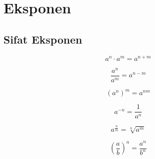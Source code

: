 \documentclass{report}
\begin{document}
\chapter{Eksponen}

\section*{Sifat Eksponen}

\begin{equation}
\label{ex_mult}
a^{n} \cdot a^{m} = a^{n+m} 
\end{equation}

\begin{equation}
\label{ex_div}
\frac{a^{n}}{a^{m}} = a^{n-m} 
\end{equation}

\begin{equation}
\label{ex_pow}
(a^n)^m = a^{nm}
\end{equation}

\begin{equation}
\label{ex_neg}
a^{-n}=\frac{1}{a^n}
\end{equation}

\begin{equation}
\label{ex_frac}
a^{\frac{n}{m}}=\sqrt[n]{a^m}
\end{equation}

\begin{equation}
\label{ex_div_pow}
\left(\frac{a}{b}\right)^{n} = \frac{a^{n}}{b^{n}}
\end{equation}
\end{document}
